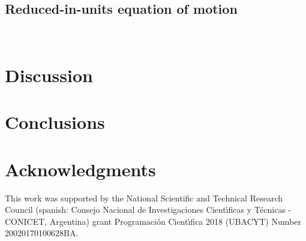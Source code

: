 \documentclass[preprint,12pt]{elsarticle}
\begin{document}
\subsection{\label{reduced-in-units} Reduced-in-units equation of motion}


\begin{figure}[!htbp]
\centering
    \ 
    \\
\caption[width=0.47\columnwidth]{}
\label{flow_density}
\end{figure}

\section{\label{discussion}Discussion}



\section{\label{conclusions}Conclusions}

\section*{Acknowledgments}
This work was supported by the National Scientific and Technical 
Research Council (spanish: Consejo Nacional de Investigaciones Cient\'\i ficas 
y T\'ecnicas - CONICET, Argentina) grant Programaci\'on Cient\'\i fica 2018 (UBACYT) Number 20020170100628BA.
\end{document}
